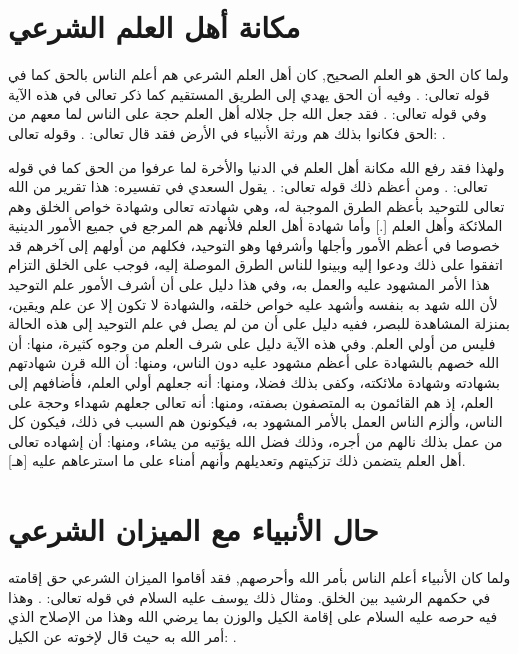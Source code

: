 \section{مكانة أهل العلم الشرعي}

ولما كان الحق هو العلم الصحيح, كان أهل العلم الشرعي هم أعلم الناس بالحق كما في قوله تعالى:
\quranayah*[34][6]{\footnotesize \surahname*[34]}. وفيه أن الحق يهدي إلى الطريق المستقيم كما ذكر تعالى في هذه الآية وفي قوله تعالى:
\quranayah*[22][54]{\footnotesize \surahname*[22]}. فقد جعل الله جل جلاله أهل العلم حجة على الناس لما معهم من الحق فكانوا بذلك هم ورثة الأنبياء في الأرض فقد قال تعالى:
\quranayah*[17][107]{\footnotesize \surahname*[17]}.
وقوله تعالى:
\quranayah*[29][49]{\footnotesize \surahname*[29]}.


ولهذا فقد رفع الله مكانة أهل العلم في الدنيا والأخرة لما عرفوا من الحق كما في قوله تعالى:
\quranayah*[58][11][19]{\footnotesize \surahname*[58]}.
ومن أعظم ذلك قوله تعالى:
\quranayah*[3][18]{\footnotesize \surahname*[3]}.
يقول السعدي في تفسيره:
هذا تقرير من الله تعالى للتوحيد بأعظم الطرق الموجبة له، وهي شهادته تعالى وشهادة خواص الخلق وهم الملائكة وأهل العلم [.] وأما شهادة أهل العلم فلأنهم هم المرجع في جميع الأمور الدينية خصوصا في أعظم الأمور وأجلها وأشرفها وهو التوحيد، فكلهم من أولهم إلى آخرهم قد اتفقوا على ذلك ودعوا إليه وبينوا للناس الطرق الموصلة إليه، فوجب على الخلق التزام هذا الأمر المشهود عليه والعمل به، وفي هذا دليل على أن أشرف الأمور علم التوحيد لأن الله شهد به بنفسه وأشهد عليه خواص خلقه، والشهادة لا تكون إلا عن علم ويقين، بمنزلة المشاهدة للبصر، ففيه دليل على أن من لم يصل في علم التوحيد إلى هذه الحالة فليس من أولي العلم. وفي هذه الآية دليل على شرف العلم من وجوه كثيرة، منها: أن الله خصهم بالشهادة على أعظم مشهود عليه دون الناس، ومنها: أن الله قرن شهادتهم بشهادته وشهادة ملائكته، وكفى بذلك فضلا، ومنها: أنه جعلهم أولي العلم، فأضافهم إلى العلم، إذ هم القائمون به المتصفون بصفته، ومنها: أنه تعالى جعلهم شهداء وحجة على الناس، وألزم الناس العمل بالأمر المشهود به، فيكونون هم السبب في ذلك، فيكون كل من عمل بذلك نالهم من أجره، وذلك فضل الله يؤتيه من يشاء، ومنها: أن إشهاده تعالى أهل العلم يتضمن ذلك تزكيتهم وتعديلهم وأنهم أمناء على ما استرعاهم عليه [هـ].

\section{حال الأنبياء مع الميزان الشرعي}

ولما كان الأنبياء أعلم الناس بأمر الله وأحرصهم, فقد أقاموا الميزان الشرعي حق إقامته في حكمهم الرشيد بين الخلق. ومثال ذلك يوسف عليه السلام في قوله تعالى:
\quranayah*[12][55]{\footnotesize \surahname*[12]}.
وهذا فيه حرصه عليه السلام على إقامة الكيل والوزن بما يرضي الله وهذا من الإصلاح الذي أمر الله به حيث قال لإخوته عن الكيل:
\quranayah*[12][59-60]{\footnotesize \surahname*[12]}.

